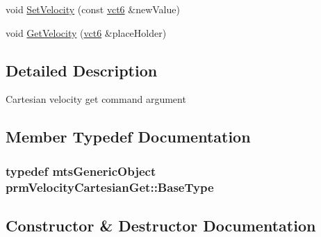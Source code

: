 {\bf }\par
\begin{DoxyCompactItemize}
\item 
void \hyperlink{classprm_velocity_cartesian_get_a140fd61c69c82eb8fc2884f6910d3eb0}{Set\+Velocity} (const \hyperlink{vct_fixed_size_vector_types_8h_abb9fb64cb9696edc946e57a342b9033a}{vct6} \&new\+Value)
\item 
void \hyperlink{classprm_velocity_cartesian_get_a8d605e9ee20a31e03cd5d3454fc73cb8}{Get\+Velocity} (\hyperlink{vct_fixed_size_vector_types_8h_abb9fb64cb9696edc946e57a342b9033a}{vct6} \&place\+Holder)
\end{DoxyCompactItemize}



\subsection{Detailed Description}
Cartesian velocity get command argument 

\subsection{Member Typedef Documentation}
\hypertarget{classprm_velocity_cartesian_get_a49e1fbc1e4ec5d09b4a9660564a1b547}{}
\subsubsection[{Base\+Type}]{\setlength{\rightskip}{0pt plus 5cm}typedef {\bf mts\+Generic\+Object} {\bf prm\+Velocity\+Cartesian\+Get\+::\+Base\+Type}}\label{classprm_velocity_cartesian_get_a49e1fbc1e4ec5d09b4a9660564a1b547}


\subsection{Constructor \& Destructor Documentation}
\hypertarget{classprm_velocity_cartesian_get_af45384ae63b5ec9c61b44f5e548f495d}{}
